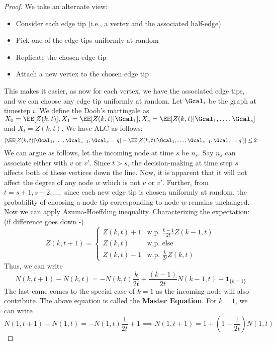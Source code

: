 \begin{proof}
We take an alternate view: 
\begin{itemize}
    \item Consider each edge tip (i.e., a vertex and the associated half-edge)
    \item Pick one of the edge tips uniformly at random
    \item Replicate the chosen edge tip
    \item Attach a new vertex to the chosen edge tip
\end{itemize}
This makes it easier, as now for each vertex, we have the associated edge tips, and we can choose any edge tip uniformly at random. Let $\Gcal_i$ be the graph at timestep $i$. We define the Doob's martingale as $X_0 = \EE[Z(k,t)], X_1 = \EE[Z(k,t) | \Gcal_1], X_s = \EE[Z(k,t) | \Gcal_1,\dots,\Gcal_s]$ and $X_t = Z(k,t)$. We have ALC as follows:
\[
|\EE[Z(k,t) | \Gcal_1, \dots, \Gcal_{s-1}, \Gcal_s = g] - \EE[Z(k,t) | \Gcal_1, \dots, \Gcal_{s-1}, \Gcal_s = g']| \leq 2
\]
We can argue as follows, let the incoming node at time $s$ be $n_s$. Say $n_s$ can associate either with $v$ or $v'$. Since $t > s$, the decision-making at time step $s$ affects both of these vertices down the line. Now, it is apparent that it will not affect the degree of any node $w$ which is not $v$ or $v'$. Further, from $t = s+1, s+2, \dots,$ since each new edge tip is chosen uniformly at random, the probability of choosing a node tip corresponding to node $w$ remains unchanged. Now we can apply Azuma-Hoeffding inequality. Characterizing the expectation: (if difference goes down -)
\[
Z(k, t+1) = \begin{cases}
Z(k,t) + 1 & \text{w.p. } \frac{k-1}{2t} Z(k-1,t) \\
Z(k,t)  & \text{w.p. } \text{else}\\
Z(k,t) - 1 & \text{w.p. } \frac{k}{2t} Z(k,t)
\end{cases}
\]
Thus, we can write
\begin{equation}
N(k,t+1) - N(k,t) = -N(k,t) \frac{k}{2t} + \frac{(k-1)}{2t} N(k-1,t) + \bm{1}_{\{k=1\}}
\end{equation}
The last came comes to the special case of $k=1$ as the incoming node will also contribute. The above equation is called the \textbf{Master Equation}. For $k=1$, we can write
\[
N(1, t+1) - N(1,t) = -N(1,t)\frac{1}{2t} + 1 \implies N(1,t+1) = 1 + \left(1 - \frac{1}{2t}\right) N(1,t)
\]
\end{proof}
